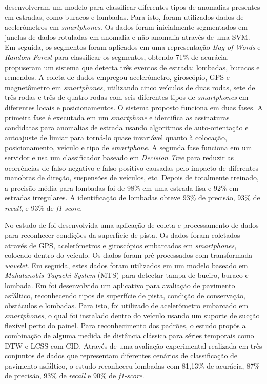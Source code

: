  desenvolveram um modelo para classificar diferentes tipos de anomalias presentes em estradas, como buracos e lombadas. Para isto, foram utilizados dados de acelerômetros em \textit{smartphones}. Os dados foram inicialmente segmentados em janelas de dados rotuladas em anomalia e não-anomalia através de uma SVM. Em seguida, os segmentos foram aplicados em uma representação \textit{Bag of Words} e \textit{Random Forest} para classificar os segmentos, obtendo 71\% de acurácia.  propuseram um sistema que detecta três eventos de estrada: lombadas, buracos e remendos. A coleta de dados empregou acelerômetro, giroscópio, GPS e magnetômetro em \textit{smartphones}, utilizando cinco veículos de duas rodas, sete de três rodas e três de quatro rodas com seis diferentes tipos de \textit{smartphones} em diferentes locais e posicionamentos. O sistema proposto funciona em duas fases. A primeira fase é executada em um \textit{smartphone} e identifica as assinaturas candidatas para anomalias de estrada usando algoritmos de auto-orientação e autoajuste de limiar para torná-lo quase invariável quanto à colocação, posicionamento, veículo e tipo de \textit{smartphone}. A segunda fase funciona em um servidor e usa um classificador baseado em \textit{Decision Tree} para reduzir as ocorrências de falso-negativo e falso-positivo causadas pelo impacto de diferentes manobras de direção, suspensões de veículos, etc. Depois de totalmente treinado, a precisão média para lombadas foi de 98\% em uma estrada lisa e 92\% em estradas irregulares. A identificação de lombadas obteve 93\% de precisão, 93\% de \textit{recall}, e 93\% de \textit{f1-score}.

No estudo de  foi desenvolvida uma aplicação de coleta e processamento de dados para reconhecer condições da superfície de pista. Os dados foram coletados através de GPS, acelerômetros e giroscópios embarcados em \textit{smartphones}, colocado dentro do veículo. Os dados foram pré-processados com transformada \textit{wavelet}. Em seguida, estes dados foram utilizados em um modelo baseado em \textit{Mahalanobis Taguchi System} (MTS) para detectar tampa de bueiro, buraco e lombada. Em  foi desenvolvido um aplicativo para avaliação de pavimento asfáltico, reconhecendo tipos de superfície de pista, condição de conservação, obstáculos e lombadas. Para isto, foi utilizado de acelerômetro embarcado em \textit{smartphones}, o qual foi instalado dentro do veículo usando um suporte de sucção flexível perto do painel. Para reconhecimento dos padrões, o estudo propôs a combinação de alguma medida de distância clássica para séries temporais como DTW e LCSS com CID. Através de uma avaliação experimental realizada em três conjuntos de dados que representam diferentes cenários de classificação de pavimento asfáltico, o estudo reconheceu lombadas com 81,13\% de acurácia, 87\% de precisão, 93\% de \textit{recall} e 90\% de \textit{f1-score}.

